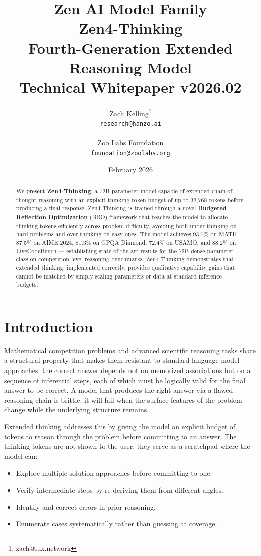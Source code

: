 \documentclass[11pt,a4paper]{article}
\title{
    \vspace{-2cm}
    \Large \textbf{Zen AI Model Family} \\
    \vspace{0.5cm}
    \Huge \textbf{Zen4-Thinking} \\
    \vspace{0.3cm}
    \large Fourth-Generation Extended Reasoning Model \\
    \vspace{0.5cm}
    \normalsize Technical Whitepaper v2026.02
}
\author{
    Zach Kelling\thanks{zach@lux.network} \\
    \texttt{research@hanzo.ai} \\
    \\
    Zoo Labs Foundation \\
    \texttt{foundation@zoolabs.org}
}
\date{February 2026}
\begin{document}
\maketitle

\begin{abstract}
We present \textbf{Zen4-Thinking}, a 72B parameter model capable of extended chain-of-thought
reasoning with an explicit thinking token budget of up to 32,768 tokens before producing
a final response. Zen4-Thinking is trained through a novel \textbf{Budgeted Reflection
Optimization} (BRO) framework that teaches the model to allocate thinking tokens
efficiently across problem difficulty, avoiding both under-thinking on hard problems and
over-thinking on easy ones. The model achieves 93.7\% on MATH, 87.5\% on AIME 2024,
81.3\% on GPQA Diamond, 72.4\% on USAMO, and 88.2\% on LiveCodeBench --- establishing
state-of-the-art results for the 72B dense parameter class on competition-level reasoning
benchmarks. Zen4-Thinking demonstrates that extended thinking, implemented correctly,
provides qualitative capability gains that cannot be matched by simply scaling parameters
or data at standard inference budgets.
\end{abstract}

\tableofcontents
\newpage

\section{Introduction}

Mathematical competition problems and advanced scientific reasoning tasks share a
structural property that makes them resistant to standard language model approaches:
the correct answer depends not on memorized associations but on a sequence of
inferential steps, each of which must be logically valid for the final answer to be correct.
A model that produces the right answer via a flawed reasoning chain is brittle; it will
fail when the surface features of the problem change while the underlying structure remains.

Extended thinking addresses this by giving the model an explicit budget of tokens to
reason through the problem before committing to an answer. The thinking tokens are not
shown to the user; they serve as a scratchpad where the model can:

\begin{itemize}
    \item Explore multiple solution approaches before committing to one.
    \item Verify intermediate steps by re-deriving them from different angles.
    \item Identify and correct errors in prior reasoning.
    \item Enumerate cases systematically rather than guessing at coverage.
\end{itemize}
\end{document}

